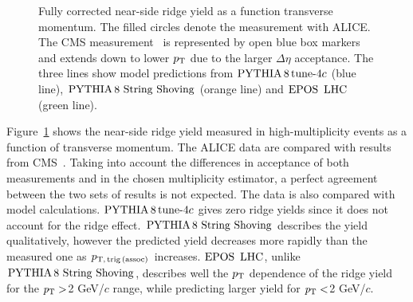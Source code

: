 \begin{figure}[h!]
	\centering
	\caption{ Fully corrected near-side ridge yield as a function transverse momentum. The filled circles denote the measurement with ALICE. The CMS measurement~\cite{Khachatryan:2015lva} is represented by open blue box markers and extends down to lower $p_\mathrm{T}$ due to the larger $\Delta\eta$ acceptance. The three lines show model predictions from $\mathrm{PYTHIA}\,8\,\mathrm{tune}{\text -}4c$ (blue line), ${\mathrm{PYTHIA}\,8~\mathrm{String}~}\mathrm{Shoving}$ (orange line) and ${\mathrm{EPOS}\,~\mathrm{LHC}}$ (green line).}
	\label{fig:PlotYSpect}
\end{figure}

Figure~\ref{fig:PlotYSpect} shows the near-side ridge yield measured in high-multiplicity events as a function of transverse momentum. The ALICE data are compared with results from CMS~\cite{Khachatryan:2015lva}.
Taking into account the differences in acceptance of both measurements and in the chosen multiplicity estimator, a perfect agreement between the two sets of results is not expected. The data is also compared with model calculations. $\mathrm{PYTHIA}\,8\,\mathrm{tune}{\text -}4c$ gives zero ridge yields since it does not account for the ridge effect. ${\mathrm{PYTHIA}\,8~\mathrm{String}~}\mathrm{Shoving}$ describes the yield qualitatively, however the predicted yield decreases more rapidly than the measured one as $p_\mathrm{T,\,trig\,(assoc)}$ increases. ${\mathrm{EPOS}\,~\mathrm{LHC}}$, unlike ${\mathrm{PYTHIA}\,8~\mathrm{String}~}\mathrm{Shoving}$, describes well the $p_\mathrm{T}$ dependence of the ridge yield for the $\it{p}_{\rm{T}}>$2 GeV/$c$ range, while predicting larger yield for $\it{p}_{\rm{T}}<$2 GeV/$c$.

